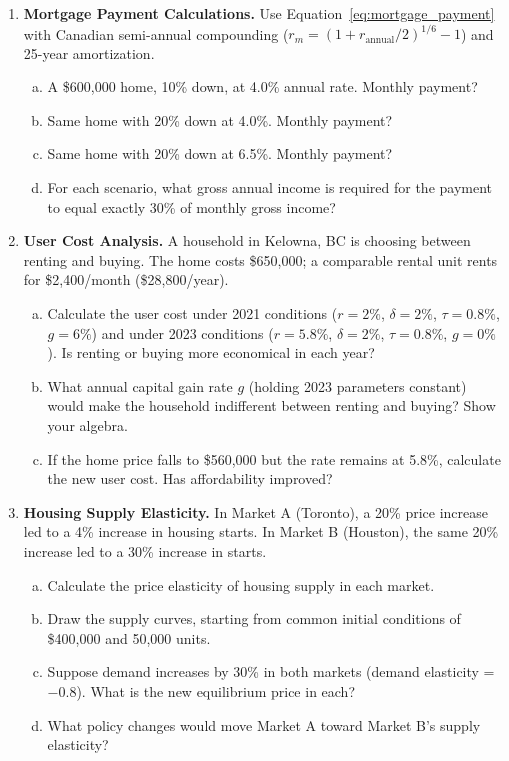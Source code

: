 \begin{enumerate}

\item \textbf{Mortgage Payment Calculations.}
Use Equation~\ref{eq:mortgage_payment} with Canadian semi-annual compounding
($r_m = (1 + r_{\text{annual}}/2)^{1/6} - 1$) and 25-year amortization.
\begin{enumerate}[(a)]
  \item A \$600{,}000 home, 10\% down, at 4.0\% annual rate. Monthly payment?
  \item Same home with 20\% down at 4.0\%. Monthly payment?
  \item Same home with 20\% down at 6.5\%. Monthly payment?
  \item For each scenario, what gross annual income is required for the
        payment to equal exactly 30\% of monthly gross income?
\end{enumerate}

\item \textbf{User Cost Analysis.}
A household in Kelowna, BC is choosing between renting and buying.
The home costs \$650{,}000; a comparable rental unit rents for
\$2{,}400/month (\$28{,}800/year).
\begin{enumerate}[(a)]
  \item Calculate the user cost under 2021 conditions ($r=2\%$, $\delta=2\%$,
        $\tau=0.8\%$, $g=6\%$) and under 2023 conditions ($r=5.8\%$,
        $\delta=2\%$, $\tau=0.8\%$, $g=0\%$). Is renting or buying more
        economical in each year?
  \item What annual capital gain rate $g$ (holding 2023 parameters constant)
        would make the household indifferent between renting and buying?
        Show your algebra.
  \item If the home price falls to \$560{,}000 but the rate remains at
        5.8\%, calculate the new user cost. Has affordability improved?
\end{enumerate}

\item \textbf{Housing Supply Elasticity.}
In Market A (Toronto), a 20\% price increase led to a 4\% increase in
housing starts. In Market B (Houston), the same 20\% increase led to
a 30\% increase in starts.
\begin{enumerate}[(a)]
  \item Calculate the price elasticity of housing supply in each market.
  \item Draw the supply curves, starting from common initial conditions
        of \$400{,}000 and 50{,}000 units.
  \item Suppose demand increases by 30\% in both markets (demand
        elasticity = $-0.8$). What is the new equilibrium price in each?
  \item What policy changes would move Market A toward Market B's
        supply elasticity?
\end{enumerate}


\end{enumerate}
